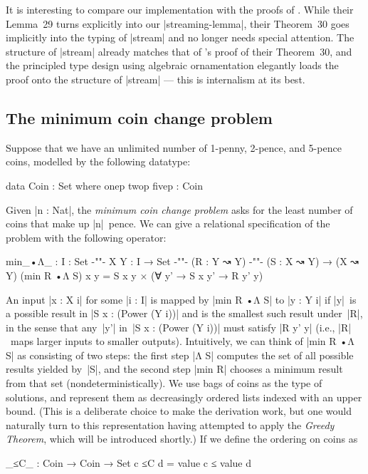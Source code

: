 It is interesting to compare our implementation with the proofs of \citet{Bird-arithmetic-coding}.
While their Lemma~29 turns explicitly into our |streaming-lemma|, their Theorem~30 goes implicitly into the typing of |stream| and no longer needs special attention.
The structure of |stream| already matches that of \citeauthor{Bird-arithmetic-coding}'s proof of their Theorem~30, and the principled type design using algebraic ornamentation elegantly loads the proof onto the structure of |stream| --- this is internalism at its best.

\subsection{The minimum coin change problem}
\label{sec:minimum-coin-change}

Suppose that we have an unlimited number of 1-penny, 2-pence, and 5-pence coins, modelled by the following datatype:
\begin{code}
data Coin : Set where
  onep twop fivep : Coin
\end{code}
Given |n : Nat|, the \emph{minimum coin change problem} asks for the least number of coins that make up |n|~pence.
We can give a relational specification of the problem with the following operator:
\begin{code}
min_•Λ_ : {I : Set} {-"\kern-1pt"-} {X Y : I → Set} {-"\kern-1pt"-} (R : Y ↝ Y) {-"\kern-1pt"-} (S : X ↝ Y) → (X ↝ Y)
(min R •Λ S) x y = S x y × (∀ y' → S x y' → R y' y)
\end{code}
An input |x : X i| for some |i : I| is mapped by |min R •Λ S| to |y : Y i| if |y|~is a possible result in |S x : (Power (Y i))| and is the smallest such result under~|R|, in the sense that any~|y'| in~|S x : (Power (Y i))| must satisfy |R y' y| (i.e., |R|~maps larger inputs to smaller outputs).
Intuitively, we can think of |min R •Λ S| as consisting of two steps: the first step |Λ S| computes the set of all possible results yielded by~|S|, and the second step |min R| chooses a minimum result from that set (nondeterministically).
We use bags of coins as the type of solutions, and represent them as decreasingly ordered lists indexed with an upper bound.
(This is a deliberate choice to make the derivation work, but one would naturally turn to this representation having attempted to apply the \emph{Greedy Theorem}, which will be introduced shortly.)
If we define the ordering on coins as
\begin{code}
_≤C_ : Coin → Coin → Set
c ≤C d = value c ≤ value d
\end{code}
